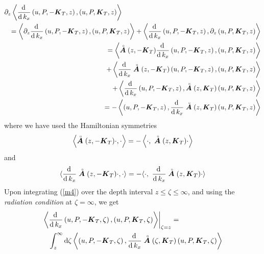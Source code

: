 \begin{eqnarray} \label{m4}
\lefteqn{{ \partial 
}_{z}\left\langle{{\frac{{\rm d}\,}{{\rm d}\,{ k}_{x}}}
\left({u,P,-{\bmi K}_{T},z}\right), 
\left({u,P,{\bmi K}_{T},z}\right)}\right\rangle}\nonumber\\ 
&&=\left\langle{{\rm \partial 
}_{z}{\frac{{\rm d}\,}{{\rm d}\,{ k}_{x}}}\left({u,P,-{\bmi K}_{T},z}\right), 
\left({u,P,{\bmi K}_{T},z}\right)}\right\rangle+\left\langle 
{{\frac{{\rm d}\,}{{\rm d}\,{ k}_{x}}}\left({u,P,-{\bmi K}_{T},z}\right),{\rm \partial 
}_{z}\left({u,P,{\bmi K}_{T},z}\right)}\right\rangle\nonumber\\
&&=\left\langle{\rf{\bmi A}(z,-{\bmi K}_{T}){\frac{{\rm d}\,}{{\rm d}\,{ k}_{x}}}\left({u,P,-{\bmi K}_{T},z}\right),
\left({u,P,{\bmi K}_{T},z}\right)}\right\rangle\nonumber\\
&&\qquad+\left\langle{
{\frac{{\rm d}\,}{{\rm 
d}\,{ k}_{x}}}\rf{\bmi  A}(z,-{\bmi K}_{T})
\left({u,P,-{\bmi K}_{T},z}\right),\left({u,P,{\bmi K}_{T},z}\right)}\right\rangle\nonumber\\
&&\qquad +
\left\langle{{\frac{{\rm d}\,}{{\rm d}\,{ k}_{x}}}
\left({u,P,-{\bmi K}_{T},z}\right),\rf{\bmi A}(z,{\bmi K}_{T})
\left({u,P,{\bmi K}_{T},z}\right)}\right\rangle\nonumber\\
&&=-\left\langle{
\left({u,P,-{\bmi K}_{T},z}\right),{\frac{{\rm d}\,}{{\rm 
d}\,{ k}_{x}}}\rf{\bmi  A}(z,{\bmi K}_{T})\left({u,P,{\bmi K}_{T},z}\right)}\right\rangle
\end{eqnarray} 
where we have used the Hamiltonian symmetries
\[
\left\langle{\stackrel{\scriptscriptstyle _{\,\,\circ}}{ \mbox{\boldmath$\mit A$\unboldmath}}(z,-{\mbox{\boldmath$\mit K$\unboldmath}}_{T}) \cdot   , \cdot 
}\right\rangle=-\left\langle{ \cdot   ,\ \stackrel{\scriptscriptstyle _{\,\,\circ}}{ \mbox{\boldmath$\mit A$\unboldmath}}(z,{\mbox{\boldmath$\mit K$\unboldmath}}_{T}) 
\cdot }\right\rangle
\]
and
\[
\langle{{\frac{{\rm d}\,}{{\rm d}\,{ k}_{x}}}
\rf{\bmi  A}(z,-{\bmi K}_{T}) \cdot   
, \cdot }\rangle=-\langle{ \cdot   ,\ 
{\frac{{\rm d}\,}{{\rm 
d}\,{ k}_{x}}}\rf{\bmi  A}(z,{\bmi K}_{T}) \cdot }\rangle
\] 
Upon integrating (\ref{m4}) over the depth interval $z\le \zeta \le 
\infty$, 
and using the {\em radiation condition\/} at $\zeta =\infty$, we get
\begin{eqnarray}	\label{mint1}
\lefteqn{
{\left.{\left\langle{{\frac{{\rm d}\,}{{\rm d}\,{ k}_{ x}}}\left({ 
	u,P,-{\bmi K}_{T},\zeta }\right) ,\left({u,P,{\bmi K}_{T},\zeta 
	}\right)}\right\rangle}\right|}_{ \zeta   =z} =}\nonumber\\
&&\int_{ 
	z}^{\infty } {\rm d} \zeta \left\langle{\left({ u,P,-{\bmi K}_{T},\zeta 
	}\right) ,{\frac{{\rm d}\,}{{\rm 
d}\,{ k}_{x}}}\rf{\bmi  A}(\zeta  ,{\bmi K}_{T})\left({u,P,{\bmi K}_{T},\zeta 
	}\right)}\right\rangle
\end{eqnarray}




